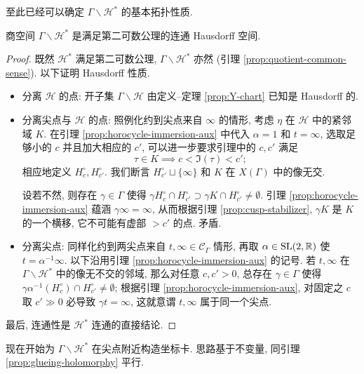 至此已经可以确定 $\Gamma \backslash \mathcal{H}^*$ 的基本拓扑性质.
\begin{lemma}\label{prop:X-curve-topology}
	商空间 $\Gamma \backslash \mathcal{H}^*$ 是满足第二可数公理的连通 Hausdorff 空间.
\end{lemma}
\begin{proof}
	既然 $\mathcal{H}^*$ 满足第二可数公理, $\Gamma \backslash \mathcal{H}^*$ 亦然 (引理 \ref{prop:quotient-common-sense}). 以下证明 Hausdorff 性质.
	\begin{itemize}
		\item 分离 $\mathcal{H}$ 的点: 开子集 $\Gamma \backslash \mathcal{H}$ 由定义--定理 \ref{prop:Y-chart} 已知是 Hausdorff 的.
		\item 分离尖点与 $\mathcal{H}$ 的点: 照例化约到尖点来自 $\infty$ 的情形, 考虑 $\eta$ 在 $\mathcal{H}$ 中的紧邻域 $K$. 在引理 \ref{prop:horocycle-immersion-aux} 中代入 $\alpha = 1$ 和 $t = \infty$, 选取足够小的 $c$ 并且加大相应的 $c'$, 可以进一步要求引理中的 $c, c'$ 满足
		\[ \tau \in K \implies c < \Im(\tau) < c'; \]
		相应地定义 $H^\circ_c, H^\circ_{c'}$. 我们断言 $H^\circ_{c'} \sqcup \{\infty\}$ 和 $K$ 在 $X(\Gamma)$ 中的像无交.
		
		设若不然, 则存在 $\gamma \in \Gamma$ 使得 $\gamma H^\circ_c \cap H^\circ_{c'} \supset \gamma K \cap H^\circ_{c'} \neq \emptyset$. 引理 \ref{prop:horocycle-immersion-aux} 蕴涵 $\gamma \infty = \infty$, 从而根据引理 \ref{prop:cusp-stabilizer}, $\gamma K$ 是 $K$ 的一个横移, 它不可能有虚部 $> c'$ 的点. 矛盾.
		\item 分离尖点: 同样化约到两尖点来自 $t, \infty \in \mathcal{C}_\Gamma$ 情形, 再取 $\alpha \in \operatorname{SL}(2,\mathbb{R})$ 使 $t = \alpha^{-1}\infty$. 以下沿用引理 \ref{prop:horocycle-immersion-aux} 的记号. 若 $t, \infty$ 在 $\Gamma \backslash \mathcal{H}^*$ 中的像无不交的邻域, 那么对任意 $c, c' > 0$, 总存在 $\gamma \in \Gamma$ 使得 $\gamma\alpha^{-1}(H^\circ_c) \cap H^\circ_{c'} \neq \emptyset$; 根据引理 \ref{prop:horocycle-immersion-aux}, 对固定之 $c$ 取 $c' \gg 0$ 必导致 $\gamma t = \infty$, 这就意谓 $t,\infty$ 属于同一个尖点.
	\end{itemize}
	最后, 连通性是 $\mathcal{H}^*$ 连通的直接结论.
\end{proof}

现在开始为 $\Gamma\backslash\mathcal{H}^*$ 在尖点附近构造坐标卡. 思路基于不变量, 同引理 \ref{prop:glueing-holomorphy} 平行.

